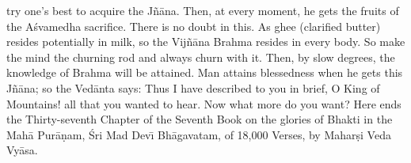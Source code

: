 try one's best to acquire the J\~n\=ana. Then, at every moment, he gets the fruits of the A\'svamedha sacrifice. There is no doubt in this. As ghee (clarified butter) resides potentially in milk, so the Vij\~n\=ana Brahma resides in every body. So make the mind the churning rod and always churn with it. Then, by slow degrees, the knowledge of Brahma will be attained.
Man attains blessedness when he gets this J\~n\=ana; so the Ved\=anta says: Thus I have described to you in brief, O King of Mountains! all that you wanted to hear. Now what more do you want?
Here ends the Thirty-seventh Chapter of the Seventh Book on the glories of Bhakti in the Mah\=a Pur\=a\d{n}am, \'Sri Mad Dev\={\i} Bh\=agavatam, of 18,000 Verses, by Mahar\d{s}i Veda Vy\=asa.



